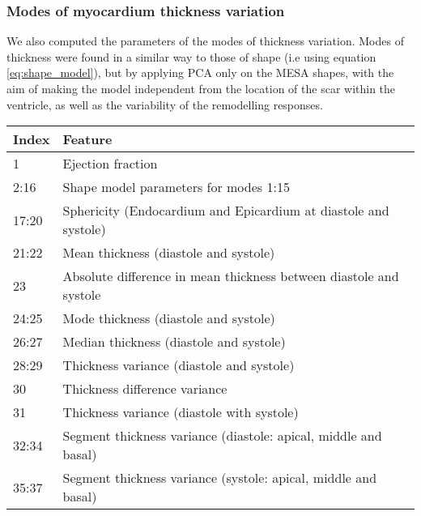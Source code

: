 \documentclass{llncs}
\begin{document}
\subsubsection{Modes of myocardium thickness variation}
We also computed the parameters of the modes of thickness variation. Modes of thickness were found in a similar way to those of shape (i.e using equation \ref{eq:shape_model}), but by applying PCA only on the MESA shapes, with the aim of making the model independent from the location of the scar within the ventricle, as well as the variability of the remodelling responses.
		\begin{table}
		\begin{center}
		
		\begin{tabular}{l|l|}
\textbf{Index} \space & \multicolumn{1}{l}{\textbf{Feature}}
\\
 \hline
\cline{1-2}
 1 & Ejection fraction \\
\cline{1-2}
 2:16 & Shape model parameters for modes 1:15\\
\cline{1-2}
 17:20 & Sphericity (Endocardium and Epicardium at diastole and systole)\\
 \cline{1-2}
 21:22 & Mean thickness (diastole and systole)\\
  23 & Absolute difference in mean thickness between diastole and systole\\
 
  24:25 & Mode thickness (diastole and systole)\\
  
  26:27 & Median thickness (diastole and systole)\\
  
  28:29 & Thickness variance (diastole and systole)\\
  
  30 & Thickness difference variance\\
  
  31 & Thickness variance (diastole with systole)\\
   \cline{1-2}
  32:34 & Segment thickness variance (diastole: apical, middle and basal)\\
   35:37 & Segment thickness variance (systole: apical, middle and basal)\\
  

\end{tabular}
\end{center}
\end{table}
\end{document}
